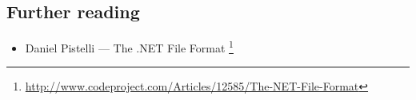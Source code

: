 \subsection{Further reading}

\begin{itemize}
\item
Daniel Pistelli --- The .NET File Format \footnote{\url{http://www.codeproject.com/Articles/12585/The-NET-File-Format}}
\end{itemize}

